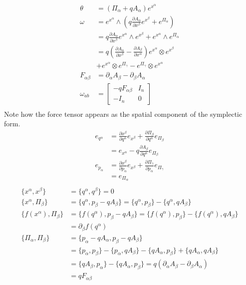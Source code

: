 \documentclass[11pt]{article}
\begin{document}
\begin{equation}
\begin{aligned}
	\theta &= (\Pi_\alpha + q A_\alpha) e^{x^\alpha} \\
	\omega &= e^{x^\alpha} \wedge \left( q \frac{\partial A_\alpha}{\partial x^\beta} e^{x^\beta} +e^{\Pi_\alpha} \right) \\
	&= q \frac{\partial A_\alpha}{\partial x^\beta} e^{x^\alpha} \wedge e^{x^\beta} + e^{x^\alpha} \wedge e^{\Pi_\alpha} \\
	&=  q \left( \frac{\partial A_\alpha}{\partial x^\beta} - \frac{\partial A_\beta}{\partial x^\alpha}\right)  e^{x^\alpha} \otimes e^{x^\beta} \\
	&+ e^{x^\alpha} \otimes e^{\Pi_\gamma} - e^{\Pi_\gamma} \otimes e^{x^\alpha} \\
	F_{\alpha\beta} &= \partial_\alpha A_\beta - \partial_\beta A_\alpha \\
	\omega_{ab} &= \left[ \begin{matrix}
		- q F_{\alpha\beta} & I_n \\[2.2ex]
		- I_n & 0 \end{matrix} \right] \\
\end{aligned}
\end{equation}
Note how the force tensor appears as the spatial component of the symplectic form.
\begin{equation}
\begin{aligned}
e_{q^\alpha} &= \frac{\partial x^\beta }{\partial q^\alpha}e_{x^\beta} + \frac{\partial \Pi_\beta}{\partial q^\alpha}e_{\Pi_\beta} \\
&= e_{x^\alpha} - q \frac{\partial A_\beta}{\partial q^\alpha}e_{\Pi_\beta} \\
e_{p_\alpha} &= \frac{\partial x^\beta}{\partial p_\alpha}e_{x^\beta} + \frac{\partial \Pi_\gamma}{\partial p_\alpha}e_{\Pi_\gamma} \\
&= e_{\Pi_\alpha} \\
\end{aligned}
\end{equation}
\begin{equation}
\begin{aligned}
\{x^\alpha, x^\beta\} &= \{q^\alpha, q^\beta\} = 0 \\
\{x^\alpha, \Pi_\beta\} &= \{q^\alpha, p_\beta - q A_\beta\} = \{q^\alpha, p_\beta\} - \{q^\alpha, q A_\beta\} \\
\{f(x^\alpha), \Pi_\beta\} &= \{f(q^\alpha), p_\beta - q A_\beta\} = \{f(q^\alpha), p_\beta\} - \{f(q^\alpha), q A_\beta\} \\
&= \partial_\beta f(q^\alpha) \\
\{ \Pi_\alpha, \Pi_\beta\} &= \{p_\alpha - q A_\alpha, p_\beta - q A_\beta\} \\
&= \{p_\alpha, p_\beta\} - \{p_\alpha, q A_\beta\} - \{q A_\alpha, p_\beta\} + \{q A_\alpha , q A_\beta\} \\
&= \{q A_\beta, p_\alpha\} - \{q A_\alpha, p_\beta\} = q (\partial_\alpha A_\beta - \partial_\beta A_\alpha) \\
&= q F_{\alpha \beta} \\
\end{aligned}
\end{equation}
\end{document}
